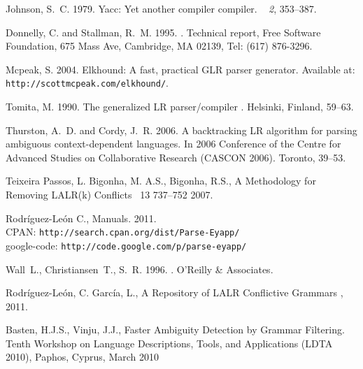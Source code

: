 
{\sc Johnson, S.~C.} 1979.
\newblock Yacc: Yet another compiler compiler.
~{\em
  2}, 353--387.

{\sc Donnelly, C.} {\sc and} {\sc Stallman, R.~M.} 1995.
.
\newblock Technical report, {F}ree {S}oftware {F}oundation, 675 Mass Ave,
  Cambridge, MA 02139, Tel: (617) 876-3296.

{\sc Mcpeak, S.} 2004.
\newblock Elkhound: A fast, practical GLR parser generator.
\newblock Available at: {\tt http://scottmcpeak.com/elkhound/}.

{\sc Tomita, M.} 1990.
\newblock The generalized LR parser/compiler 
. Helsinki, Finland, 59--63.

{\sc Thurston, A.~D.} {\sc and} {\sc Cordy, J.~R.} 2006.
\newblock A backtracking LR algorithm for parsing ambiguous context-dependent
  languages.
\newblock In { 2006 Conference of the Centre for Advanced Studies on
  Collaborative Research (CASCON 2006)}. Toronto, 39--53.

{\sc Teixeira Passos, L. Bigonha, M. A.S.,  Bigonha, R.S.},
\newblock A Methodology for Removing LALR(k) Conflicts
~{13} 737--752 2007.

{\sc Rodr\'iguez-Le\'on C.},
 Manuals. 2011.
\newblock \\CPAN: {\tt http://search.cpan.org/dist/Parse-Eyapp/ } 
\newblock \\google-code: {\tt http://code.google.com/p/parse-eyapp/ } 

{\sc Wall~L., Christiansen~T., S.~R.} 1996.
.
\newblock O'Reilly \& Associates.

{\sc Rodr\'iguez-Le\'on, C. Garc\'ia, L.},
\newblock A Repository of LALR Conflictive Grammars 
, 2011.

{\sc Basten, H.J.S., Vinju, J.J.},
\newblock Faster Ambiguity Detection by Grammar Filtering. 
\newblock Tenth Workshop on Language Descriptions, Tools, and Applications (LDTA 2010), Paphos, Cyprus, March 2010

